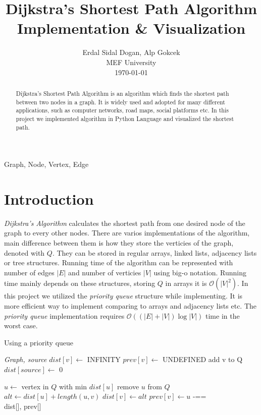 \documentclass[twocolumns]{IEEEtran}
\author{Erdal Sidal Dogan, Alp Gokcek \\ MEF University \\ \today}
\title{Dijkstra's Shortest Path Algorithm Implementation \& Visualization}
\begin{document}
	\maketitle
	\begin{abstract}
		Dijkstra's Shortest Path Algorithm is an algorithm which finds the shortest path between two nodes in a graph. It is widely used and adopted for many different applications, such as computer networks, road maps, social platforms etc. In this project we implemented algorithm in Python Language and visualized the shortest path.
	\end{abstract}
	\begin{IEEEkeywords}
		Graph, Node, Vertex, Edge
	\end{IEEEkeywords}
	\section{Introduction}
	\textit{Dijkstra's Algorithm} calculates the shortest path from one desired node of the graph to every other nodes. There are varios implementations of the algorithm, main difference between them is how they store the verticies of the graph, denoted with $Q$. They can be stored in regular arrays, linked lists, adjacency lists or tree structures. Running time of the algorithm can be represented with number of edges $|E|$ and number of verticies $|V|$ using big-o notation. Running time mainly depends on these structures, storing $Q$ in arrays it is $\mathcal{O}(|V|^2)$. In this project we utilized the \textit{priority queue} structure while implementing. It is more efficient way to implement comparing to arrays and adjacency lists etc. The \textit{priority queue} implementation requires $\mathcal{O}((|E| + |V|) \log{|V|})$ time in the worst case. 
	\begin{algorithm}
		\caption{Using a priority queue \cite{wiki}}
		\begin{algorithmic}[1]
			 {\textit{Graph, source}}
					\State $dist[v] \leftarrow$ INFINITY                  
					\State $prev[v] \leftarrow$ UNDEFINED
					\State add v to Q                      
				\EndFor
				\State $dist[source] \leftarrow$ 0
	
					\State $u \leftarrow$ vertex in $Q$ with min $dist[u]$
					\State remove $u$ from $Q$
						\State $alt \leftarrow dist[u] + length(u, v)$
							\State $dist[v] \leftarrow alt$
							\State $prev[v] \leftarrow u$
						\EndIf
					\EndFor-==
				\EndWhile \\
				\Return dist[], prev[]
			\EndFunction
		\end{algorithmic}
	\end{algorithm}
\end{document}
